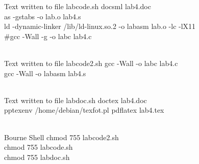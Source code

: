 \documentclass{article}
\begin{document}
\begin{GFT}{Text written to file labcode.sh}
\+docsml lab4.doc\\
\+as -gstabs -o lab.o lab4.s\\
\+ld -dynamic-linker /lib/ld-linux.so.2 -o labasm lab.o -lc -lX11\\
\+\#gcc -Wall -g -o labc lab4.c\\
\+\\
\end{GFT}
\begin{GFT}{Text written to file labcode2.sh}
\+gcc -Wall -o labc lab4.c\\
\+gcc -Wall -o labasm lab4.s\\
\+\\
\end{GFT}
\begin{GFT}{Text written to file labdoc.sh}
\+doctex lab4.doc\\
\+pptexenv /home/debian/texfot.pl pdflatex lab4.tex\\
\+\\
\end{GFT}
\begin{GFT}{Bourne Shell}
\+chmod 755 labcode2.sh\\
\+chmod 755 labcode.sh\\
\+chmod 755 labdoc.sh\\
\+\\
\end{GFT}
\end{document}
